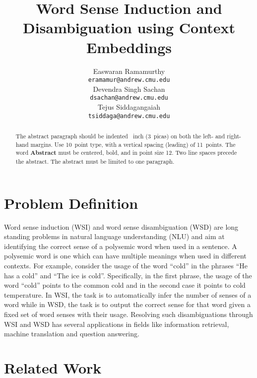 \documentclass{article}
\title{Word Sense Induction and Disambiguation using Context Embeddings}
\author{
  Easwaran Ramamurthy \\
  \texttt{eramamur@andrew.cmu.edu} \\
   \And
  Devendra Singh Sachan \\
  \texttt{dsachan@andrew.cmu.edu} \\
  \AND
  Tejus Siddagangaiah \\
  \texttt{tsiddaga@andrew.cmu.edu} \\
}
\begin{document}

\maketitle

\begin{abstract}
  The abstract paragraph should be indented ~inch
  (3~picas) on both the left- and right-hand margins. Use 10~point
  type, with a vertical spacing (leading) of 11~points.  The word
  \textbf{Abstract} must be centered, bold, and in point size 12. Two
  line spaces precede the abstract. The abstract must be limited to
  one paragraph.
\end{abstract}

\section{Problem Definition}

Word sense induction (WSI) and word sense disambiguation (WSD) are long standing problems in natural language understanding (NLU) and aim at identifying the correct sense of a polysemic word when used in a sentence. A polysemic word is one which can have multiple meanings when used in different contexts. For example, consider the usage of the word “cold” in the phrases “He has a cold” and “The ice is cold”. Specifically, in the first phrase, the usage of the word “cold” points to the common cold and in the second case it points to cold temperature. In WSI, the task is to automatically infer the number of senses of a word while in WSD, the task is to output the correct sense for that word given a fixed set of word senses with their usage. Resolving such disambiguations through WSI and WSD has several applications in fields like information retrieval, machine translation and question answering.

\section{Related Work}
\end{document}
